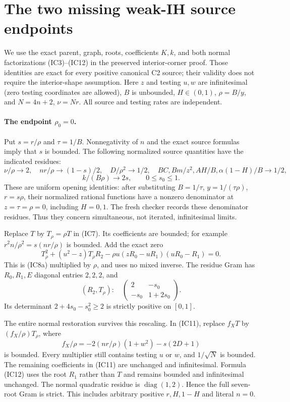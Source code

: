 \section{The two missing weak-IH source endpoints}
\label{sec:weak-ih-endpoints}
We use the exact parent, graph, roots, coefficients $K,k$, and both
normal factorizations (IC3)--(IC12) in the preserved interior-corner
proof.  Those identities are exact for every positive canonical C2
source; their validity does not require the interior-shape assumption.
Here $z$ and testing $u,w$ are infinitesimal (zero testing coordinates
are allowed), $B$ is unbounded, $H\in(0,1)$, $\rho=B/y$, and
$N=4n+2$, $\nu=Nr$. All source and testing rates are independent.

\paragraph{The endpoint $\rho_0=0$.}
Put $s=r/\rho$ and $\tau=1/B$. Nonnegativity of $n$ and the exact
source formulas imply that $s$ is bounded. The following normalized
source quantities have the indicated residues:
\[
 \nu/\rho\to2,\quad nr/\rho\to(1-s)/2,\quad
 D/\rho^2\to1/2,\quad BC,Bm/z^2,AH/B,\alpha(1-H)/B\to1/2,
\]
\[
 k/(B\rho)\to2s,\qquad 0\le s_0\le1.
\tag{WIE1}
\]
These are uniform opening identities: after substituting
$B=1/\tau$, $y=1/(\tau\rho)$, $r=s\rho$, their normalized rational
functions have a nonzero denominator at $z=\tau=\rho=0$, including
$H=0,1$. The fresh checker records these denominator residues.
Thus they concern simultaneous, not iterated, infinitesimal limits.

Replace $T$ by $T_\rho=\rho T$ in (IC7). Its coefficients are bounded;
for example $r^2n/\rho^2=s(nr/\rho)$ is bounded. Add the exact zero
\[
 T_\rho^2+(u^2-z)T_\rho R_2
 -\rho u(zR_0-uR_1)(uR_0-R_1)=0.
\tag{WIE2}
\]
This is (IC8a) multiplied by $\rho$, and uses no mixed inverse.
The residue Gram has $R_0,R_1,E$ diagonal entries $2,2,2$, and
\[
 (R_2,T_\rho):\quad
 \begin{pmatrix}2&-s_0\\-s_0&1+2s_0\end{pmatrix}.
\]
Its determinant $2+4s_0-s_0^2\ge2$ is strictly positive on $[0,1]$.

The entire normal restoration survives this rescaling. In (IC11),
replace $f_XT$ by $(f_X/\rho)T_\rho$, where
\[
 f_X/\rho=-2(nr/\rho)(1+w^2)-s(2D+1)
\]
is bounded. Every multiplier still contains testing $u$ or $w$, and
$1/\sqrt N$ is bounded. The remaining coefficients in (IC11) are
unchanged and infinitesimal. Formula (IC12) uses the root $R_1$ rather
than $T$ and remains bounded and infinitesimal unchanged. The normal
quadratic residue is $\operatorname{diag}(1,2)$. Hence the full
seven-root Gram is strict. This includes arbitrary positive $r,H,1-H$
and literal $n=0$.

